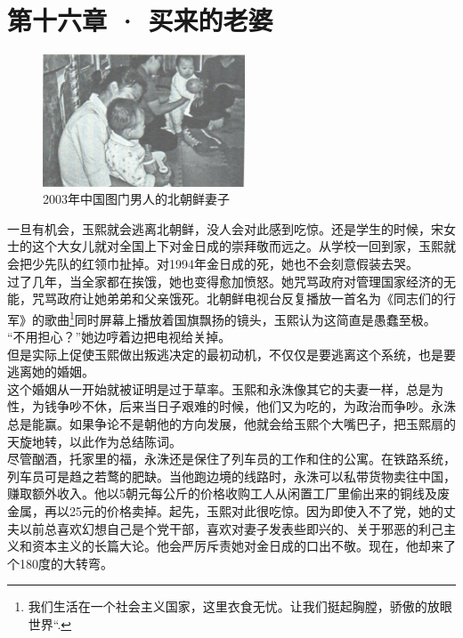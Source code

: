 \fancyhead[RO]{\thepage}
\fancyhead[LE]{\thepage}
\fancyfoot[LE,RO]{}
\fancyfoot[LO,CE]{}
\fancyfoot[CO,RE]{}
\chapter*{第十六章 · 买来的老婆}
\begin{figure}[!htbp]
\centering
\includegraphics[width=6cm]{./Chapters/Images/16.jpg}
\caption*{2003年中国图门男人的北朝鲜妻子}
\end{figure}


一旦有机会，玉熙就会逃离北朝鲜，没人会对此感到吃惊。还是学生的时候，宋女士的这个大女儿就对全国上下对金日成的崇拜敬而远之。从学校一回到家，玉熙就会把少先队的红领巾扯掉。对1994年金日成的死，她也不会刻意假装去哭。\\

过了几年，当全家都在挨饿，她也变得愈加愤怒。她咒骂政府对管理国家经济的无能，咒骂政府让她弟弟和父亲饿死。北朝鲜电视台反复播放一首名为《同志们的行军》的歌曲\footnote{我们生活在一个社会主义国家，这里衣食无忧。让我们挺起胸膛，骄傲的放眼世界“.}同时屏幕上播放着国旗飘扬的镜头，玉熙认为这简直是愚蠢至极。\\

“不用担心？”她边哼着边把电视给关掉。\\

但是实际上促使玉熙做出叛逃决定的最初动机，不仅仅是要逃离这个系统，也是要逃离她的婚姻。\\

这个婚姻从一开始就被证明是过于草率。玉熙和永洙像其它的夫妻一样，总是为性，为钱争吵不休，后来当日子艰难的时候，他们又为吃的，为政治而争吵。永洙总是能赢。如果争论不是朝他的方向发展，他就会给玉熙个大嘴巴子，把玉熙扇的天旋地转，以此作为总结陈词。\\

尽管酗酒，托家里的福，永洙还是保住了列车员的工作和住的公寓。在铁路系统，列车员可是趋之若鹜的肥缺。当他跑边境的线路时，永洙可以私带货物卖往中国，赚取额外收入。他以5朝元每公斤的价格收购工人从闲置工厂里偷出来的铜线及废金属，再以25元的价格卖掉。起先，玉熙对此很吃惊。因为即使入不了党，她的丈夫以前总喜欢幻想自己是个党干部，喜欢对妻子发表些即兴的、关于邪恶的利己主义和资本主义的长篇大论。他会严厉斥责她对金日成的口出不敬。现在，他却来了个180度的大转弯。\\

